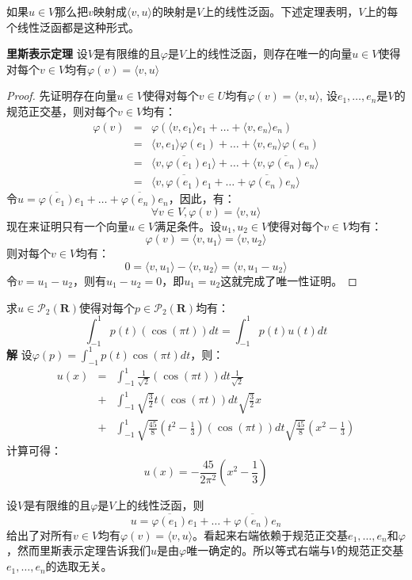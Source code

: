 \documentclass[10pt,a4paper,UTF8]{article}
\begin{document}
如果\(u\in V\)那么把\(v\)映射成\(\langle v,u \rangle\)的映射是\(V\)上的线性泛函。下述定理表明，\(V\)上的每个线性泛函都是这种形式。
\begin{theorem}
\textbf{里斯表示定理} 设\(V\)是有限维的且\(\varphi\)是\(V\)上的线性泛函，则存在唯一的向量\(u\in V\)使得对每个\(v\in V\)均有\(\varphi(v)= \langle v,u \rangle\)
\end{theorem}

\begin{proof}
先证明存在向量\(u\in V\)使得对每个\(v\in U\)均有\(\varphi(v)= \langle v,u \rangle\), 设\(e_{1},\ldots ,e_{n}\)是\(V\)的规范正交基，则对每个\(v\in V\)均有：
\begin{eqnarray}
\label{eq:15}
\varphi(v)&=& \varphi ( \langle v,e_{1} \rangle e_{1} + \ldots + \langle v,e_{n} \rangle e_{n}   ) \\
&=& \langle v,e_{1} \rangle \varphi(e_{1}) + \ldots + \langle v,e_{n} \rangle \varphi(e_{n}) \\
&=& \langle v, \overline{\varphi(e_{1})}e_{1} \rangle  + \ldots + \langle v,\overline{\varphi(e_{n})}e_{n} \rangle \\
&=& \langle v, \overline{\varphi(e_{1})}e_{1} + \ldots + \overline{\varphi(e_{n})}e_{n} \rangle
\end{eqnarray}
令\(u = \overline{\varphi(e_{1})}e_{1} + \ldots + \overline{\varphi(e_{n})}e_{n}\)，因此，有：
\[\forall v\in V, \varphi(v) = \langle v,u \rangle  \]
现在来证明只有一个向量\(u\in V\)满足条件。设\(u_{1},u_{2}\in V\)使得对每个\(v\in V\)均有：
\[\varphi(v) = \langle v,u_{1} \rangle  = \langle v,u_{2} \rangle  \]
则对每个\(v\in V\)均有：
\[0 = \langle v,u_{1} \rangle - \langle v,u_{2} \rangle = \langle v,u_{1}-u_{2} \rangle   \]
令\(v = u_{1} - u_{2}\)，则有\(u_{1} - u_{2} = 0\)，即\(u_{1} = u_{2}\)这就完成了唯一性证明。
\end{proof}

\begin{instance}
求\(u\in \mathcal{P}_{2}(\mathbf{R})\)使得对每个\(p\in \mathcal{P}_{2}(\mathbf{R})\)均有：
\[\int_{-1}^{1} p(t)(\cos(\pi t)) dt = \int_{-1}^{1} p(t)u(t)dt\]
\textbf{解} 设\(\varphi(p) = \int_{-1}^{1} p(t)\cos(\pi t)dt\)，则：
\begin{eqnarray}
\label{eq:16}
u(x)&=& \int_{-1}^{1} \frac{1}{\sqrt{2}} (\cos(\pi t))  dt \frac{1}{\sqrt{2}} \\
&+&\int_{-1}^{1} \sqrt{\frac{3}{2}} t (\cos(\pi t))  dt \sqrt{\frac{3}{2}} x \\
&+&\int_{-1}^{1} \sqrt{\frac{45}{8}} (t^{2} - \frac{1}{3}) (\cos(\pi t))  dt \sqrt{\frac{45}{8}} (x^{2} - \frac{1}{3})
\end{eqnarray}
计算可得：
\[u(x) = -\frac{45}{2\pi^{2}}(x^2 - \frac{1}{3})\]
\end{instance}

设\(V\)是有限维的且\(\varphi\)是\(V\)上的线性泛函，则
\[u = \overline{\varphi(e_{1})}e_{1} + \ldots + \overline{\varphi(e_{n})} e_{n}\]
给出了对所有\(v\in V\)均有\(\varphi(v) = \langle v,u \rangle\)。看起来右端依赖于规范正交基\(e_{1},\ldots ,e_{n}\)和\(\varphi\)，然而里斯表示定理告诉我们\(u\)是由\(\varphi\)唯一确定的。所以等式右端与\(V\)的规范正交基\(e_{1},\ldots ,e_{n}\)的选取无关。
\end{document}
